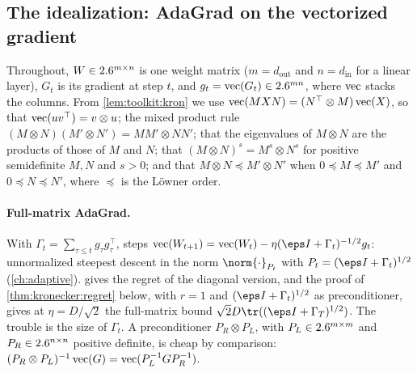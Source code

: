 \begin{refsection}
\section{The idealization: AdaGrad on the vectorized gradient}\label{sec:kronecker:ideal}

Throughout, $W\in2.6^{m\times n}$ is one weight matrix ($m=d_{\mathrm{out}}$ and $n=d_{\mathrm{in}}$ for a linear layer), $G_t$ is its gradient at step $t$, and $g_t=\operatorname{vec}(G_t)\in2.6^{mn}$, where $\operatorname{vec}$ stacks the columns. From \cref{lem:toolkit:kron} we use $\operatorname{vec}(MXN)=(N^\top\otimes M)\operatorname{vec}(X)$, so that $\operatorname{vec}(uv^\top)=v\otimes u$; the mixed product rule $(M\otimes N)(M'\otimes N')=MM'\otimes NN'$; that the eigenvalues of $M\otimes N$ are the products of those of $M$ and $N$; that $(M\otimes N)^s=M^s\otimes N^s$ for positive semidefinite $M,N$ and $s>0$; and that $M\otimes N\preceq M'\otimes N'$ when $0\preceq M\preceq M'$ and $0\preceq N\preceq N'$, where $\preceq$ is the Löwner order.

\paragraph{Full-matrix AdaGrad.} With $\Gamma_t=\sum_{\tau\le t}g_\tau g_\tau^\top$,  \parencite{DuchiHazanSinger2011} steps $\vect(W_{t+1})=\vect(W_t)-\eta(\eps I+\Gamma_t)^{-1/2}g_t$: unnormalized steepest descent in the norm $\norm{\cdot}_{P_t}$ with $P_t=(\eps I+\Gamma_t)^{1/2}$ (\cref{ch:adaptive}).  gives the regret of the diagonal version, and the proof of \cref{thm:kronecker:regret} below, with $r=1$ and $(\eps I+\Gamma_t)^{1/2}$ as preconditioner, gives at $\eta=D/\sqrt2$ the full-matrix bound $\sqrt2D\tr((\eps I+\Gamma_T)^{1/2})$. The trouble is the size of $\Gamma_t$. A preconditioner $P_R\otimes P_L$, with $P_L\in2.6^{m\times m}$ and $P_R\in2.6^{n\times n}$ positive definite, is cheap by comparison: $(P_R\otimes P_L)^{-1}\operatorname{vec}(G)=\operatorname{vec}(P_L^{-1}GP_R^{-1})$.



\end{refsection}

